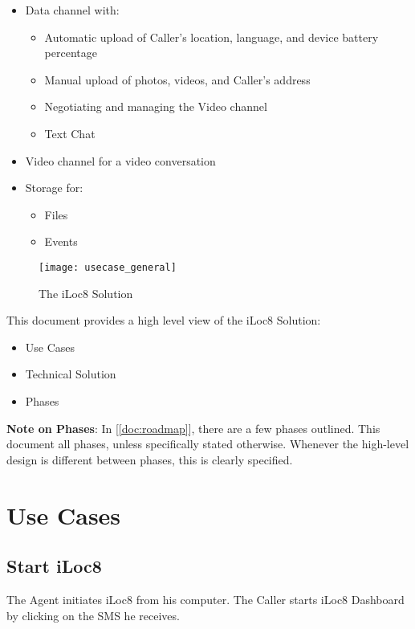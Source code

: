 \documentclass{article}
\begin{document}
	\begin{itemize}
		\item Data channel with:
		\begin{itemize}
			\item Automatic upload of Caller's location, language, and device battery percentage
			\item Manual upload of photos, videos, and Caller's address
			\item Negotiating and managing the Video channel
			\item Text Chat
		\end{itemize}
		\item Video channel for a video conversation
		\item Storage for:
		\begin{itemize}
				\item Files
				\item Events
		\end{itemize}
	\end{itemize}
	
	\begin{figure}[htbp]
		\hspace{2cm}
		\texttt{[image: usecase\_general]}
		\caption{The iLoc8 Solution}
		\label{fig:usecase_general}
	\end{figure}
    
	This document provides a high level view of the iLoc8 Solution:
	\begin{itemize}
		\item Use Cases
		\item Technical Solution
		\item Phases
	\end{itemize}
	
	\textbf{Note on Phases}: In [\ref{doc:roadmap}], there are a few phases outlined. This document all phases, unless specifically stated otherwise. Whenever the high-level design is different between phases, this is clearly specified.

	\section{Use Cases}

	\subsection{Start iLoc8}
	
	The Agent initiates iLoc8 from his computer. The Caller starts iLoc8 Dashboard by clicking on the SMS he receives.
	
\end{document}

